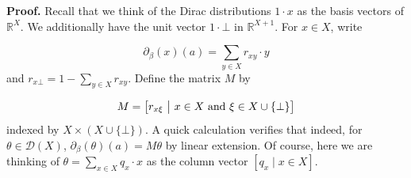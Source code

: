 \hypertarget{html:S7.SS0.SSS0.P0.SPx5}{} \par\noindent\textbf{Proof.}\quad  %
\hypertarget{html:S7.SS0.SSS0.P0.SPx5.p1}{} Recall that we think of the Dirac distributions %
\hypertarget{html:S7.SS0.SSS0.P0.SPx5.p1.m1}{}\({1\cdot x}\) as the basis vectors of %
\hypertarget{html:S7.SS0.SSS0.P0.SPx5.p1.m2}{}\({\mathbb{R}^{X}}\). We additionally have the unit vector %
\hypertarget{html:S7.SS0.SSS0.P0.SPx5.p1.m3}{}\({1\cdot\bot}\) in %
\hypertarget{html:S7.SS0.SSS0.P0.SPx5.p1.m4}{}\({\mathbb{R}^{X+1}}\). For %
\hypertarget{html:S7.SS0.SSS0.P0.SPx5.p1.m5}{}\({x\in X}\), write
\par\medskip
\hypertarget{html:S7.Ex4}{}   %
\hypertarget{html:S7.Ex4.m1}{}\[\partial_{\beta}(x)(a)=\sum_{y\in X}r_{xy}\cdot y\]    and %
\hypertarget{html:S7.SS0.SSS0.P0.SPx5.p1.m6}{}\({r_{x\bot}=1-\sum_{y\in X}r_{xy}}\). Define the matrix %
\hypertarget{html:S7.SS0.SSS0.P0.SPx5.p1.m7}{}\({M}\) by
\par\medskip
\hypertarget{html:S7.Ex5}{}   %
\hypertarget{html:S7.Ex5.m1}{}\[M=\begin{bmatrix}r_{x\xi}\leavevmode\nobreak\ \big{|}\leavevmode\nobreak\ x\in
X\text{ and }\xi\in X\cup\{\bot\}\end{bmatrix}\]    indexed by %
\hypertarget{html:S7.SS0.SSS0.P0.SPx5.p1.m8}{}\({X\times(X\cup\{\bot\})}\). A quick calculation verifies that indeed, for %
\hypertarget{html:S7.SS0.SSS0.P0.SPx5.p1.m9}{}\({\theta\in{\mathcal{D}}(X)}\), %
\hypertarget{html:S7.SS0.SSS0.P0.SPx5.p1.m10}{}\({\partial_{\beta}(\theta)(a)=M\theta}\) by linear extension. Of course, here we are thinking of %
\hypertarget{html:S7.SS0.SSS0.P0.SPx5.p1.m11}{}\({\theta=\sum_{x\in X}q_{x}\cdot x}\) as the column vector %
\hypertarget{html:S7.SS0.SSS0.P0.SPx5.p1.m12}{}\({[q_{x}\mid x\in X]}\).
\par\medskip
